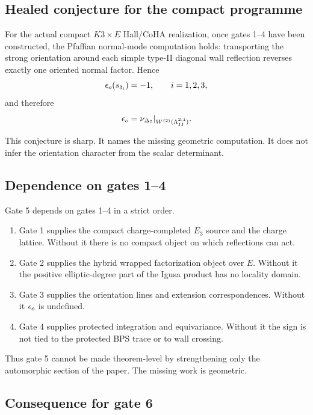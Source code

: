 \subsection{Healed conjecture for the compact programme}

\begin{conjecture}
For the actual compact \(K3\times E\) Hall/CoHA realization, once gates
1--4 have been constructed, the Pfaffian normal-mode computation holds:
transporting the strong orientation around each simple type-II diagonal
wall reflection reverses exactly one oriented normal factor.  Hence
\[
        \epsilon_o(s_{\delta_i})=-1,\qquad i=1,2,3,
\]
and therefore
\[
        \epsilon_o=\nu_{\Delta_5}|_{W^{(2)}(\Lambda^{2,1}_{II})}.
\]
\end{conjecture}

This conjecture is sharp.  It names the missing geometric computation.
It does not infer the orientation character from the scalar determinant.

\subsection{Dependence on gates 1--4}

Gate 5 depends on gates 1--4 in a strict order.

\begin{enumerate}
\item Gate 1 supplies the compact charge-completed \(E_3\) source and
the charge lattice.  Without it there is no compact object on which
reflections can act.
\item Gate 2 supplies the hybrid wrapped factorization object over
\(E\).  Without it the positive elliptic-degree part of the Igusa
product has no locality domain.
\item Gate 3 supplies the orientation lines and extension
correspondences.  Without it \(\epsilon_o\) is undefined.
\item Gate 4 supplies protected integration and equivariance.  Without
it the sign is not tied to the protected BPS trace or to wall crossing.
\end{enumerate}

Thus gate 5 cannot be made theorem-level by strengthening only the
automorphic section of the paper.  The missing work is geometric.

\subsection{Consequence for gate 6}

